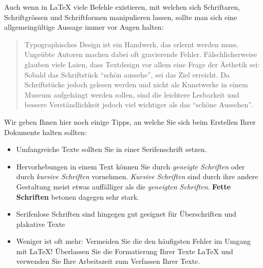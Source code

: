 \documentclass[11pt, a4paper]{article}
\newcommand{\ltx}{\LaTeX}
\begin{document}
Auch wenn in \ltx{} viele Befehle existieren, mit welchen sich Schriftaren, Schriftgrössen und Schriftformen manipulieren lassen, sollte man sich eine allgemeingültige Aussage immer vor Augen halten:
\begin{quote}
Typographisches Design ist ein Handwerk, das erlernt werden muss. Ungeübte Autoren machen dabei oft gravierende Fehler. Fälschlicherweise glauben viele Laien, dass Textdesign vor allem eine Frage der Ästhetik sei: Sobald das Schriftstück "`schön aussehe"', sei das Ziel erreicht. Da Schriftstücke jedoch gelesen werden und nicht als Kunstwerke in einem Museum aufgehängt werden sollen, sind die leichtere Lesbarkeit und bessere Verständlichkeit jedoch viel wichtiger als das "`schöne Aussehen"'.
\end{quote}

\noindent Wir geben Ihnen hier noch einige Tipps, an welche Sie sich beim Erstellen Ihrer Dokumente halten sollten:
\begin{itemize}
\item[\ding{43}] Umfangreiche Texte sollten Sie in einer Serifenschrift setzen.
\item[\ding{43}] Hervorhebungen in einem Text können Sie durch \textsl{geneigte Schriften} oder durch \textit{kursive Schriften} vornehmen. \textit{Kursive Schriften} sind durch ihre andere Gestaltung meist etwas auffälliger als die \textsl{geneigten Schriften}. \textbf{Fette Schriften} betonen dagegen sehr stark.
\item[\ding{43}]  \textsf{Serifenlose Schriften sind hingegen gut geeignet für Überschriften und plakative Texte}
\item[\ding{43}] Weniger ist oft mehr: Vermeiden Sie die den häufigsten Fehler im Umgang mit \ltx! Überlassen Sie die Formatierung Ihrer Texte \ltx{} und verwenden Sie Ihre Arbeitszeit zum Verfassen Ihrer Texte.
\end{itemize}
\end{document}
